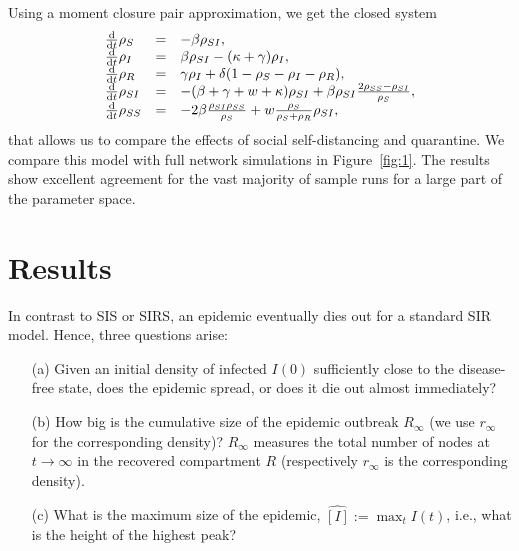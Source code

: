 \documentclass[12pt]{article}
\def\txtd{{\textnormal{d}}}
\begin{document}
 Using a moment closure pair approximation, we get the closed system 
\begin{equation}
\label{eq:mfa}
  \begin{array}{lcl}
  \frac{\txtd }{\txtd t}{\rho_S}&=&-\beta \rho_{SI},\\ 
  \frac{\txtd }{\txtd t}{\rho_{I}}&= &
  \beta\rho_{SI}-(\kappa+\gamma)\rho_{I},\\
  \frac{\txtd }{\txtd t}{\rho_{R}}&=&
  \gamma\rho_I +\delta (1-\rho_{S}-\rho_{I}-\rho_{R}),\\
  \frac{\txtd }{\txtd t}{\rho_{SI}}&=&
  -(\beta+\gamma+w+\kappa)\rho_{SI}+\beta\rho_{SI}\frac{2\rho_{SS}-\rho_{SI}}{\rho_S},\\
  \frac{\txtd }{\txtd t}{\rho_{SS}}&=& - 2\beta\frac{\rho_{SI}\rho_{SS}}{\rho_{S}}+w\frac{\rho_S}{\rho_S+\rho_{R}}\rho_{SI},
  \end{array}
 \end{equation}
 that allows us to compare the effects of social self-distancing and quarantine. We compare this model with full network simulations in Figure~\ref{fig:1}. The results show excellent agreement for the vast majority of sample runs for a large part of the parameter space.

\section{Results}
\label{sec:results}

In contrast to SIS or SIRS, an epidemic eventually dies out for a standard SIR model. Hence, three questions arise:
\begin{enumerate}
    \item[(a)] Given an initial density of infected $I(0)$ sufficiently close to the disease-free state, does the epidemic spread, or does it die out almost immediately?
\item[(b)]How big is the cumulative size of the epidemic outbreak $R_\infty$ (we use $r_\infty$ for the corresponding density)? $R_\infty$ measures the total number of nodes at $t\to\infty$ in the recovered compartment $R$ (respectively $r_\infty$ is the corresponding density).
\item[(c)]What is the maximum size of the epidemic, $\widehat{[I]}:=\max_tI(t)$, i.e., what is the height of the highest peak?
\end{enumerate}\medskip  
\end{document}

